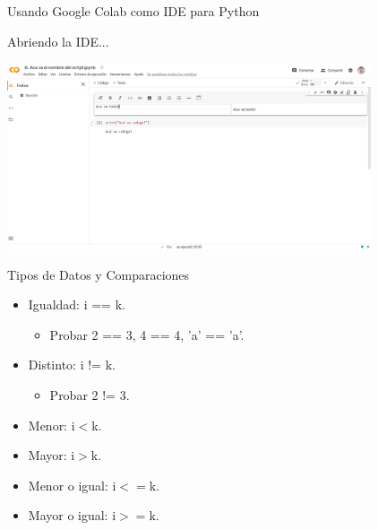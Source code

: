 \documentclass{beamer}
\begin{document}
\begin{frame}{Usando Google Colab como IDE para Python}
\begin{block}{Abriendo la IDE...}
\end{block}
\includegraphics[height=5.5cm]{colab_raw.png}
\end{frame}


\begin{frame}{Tipos de Datos y Comparaciones}
\begin{itemize}
	\item Igualdad: i == k.\pause
	\begin{itemize}
		\item Probar 2 == 3, 4 == 4, 'a' == 'a'.
	\end{itemize}\pause
	\item Distinto: i != k.\pause
	\begin{itemize}
		\item  Probar 2 != 3.
	\end{itemize}\pause
	\item Menor: i$<$k.\pause
	\item Mayor: i$>$k.\pause
	\item Menor o igual: i$<=$k.\pause
	\item Mayor o igual: i$>=$k.
\end{itemize}
\end{frame}
\end{document}
